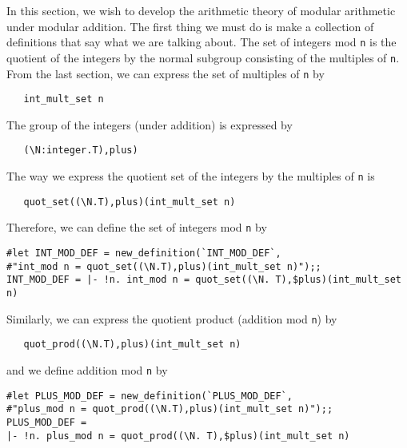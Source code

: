 In this section, we wish to develop the arithmetic theory of modular
arithmetic under modular addition.  The first thing we must do is make
a collection of definitions that say what we are talking about.  The
set of integers mod {\small\tt n} is the quotient of the integers by
the normal subgroup consisting of the multiples of {\small\tt n}.
From the last section, we can express the set of multiples of
{\small\tt n} by 
\begin{verbatim}
   int_mult_set n
\end{verbatim}
The group of the integers (under addition) is expressed by
\begin{verbatim}
   (\N:integer.T),plus)
\end{verbatim}
The way we express the quotient set of the integers by the multiples
of {\small\tt n} is
\begin{verbatim}
   quot_set((\N.T),plus)(int_mult_set n)
\end{verbatim}
Therefore, we can define the set of integers mod {\small\tt n} by
\begin{session}
\begin{verbatim}
#let INT_MOD_DEF = new_definition(`INT_MOD_DEF`,
#"int_mod n = quot_set((\N.T),plus)(int_mult_set n)");;
INT_MOD_DEF = |- !n. int_mod n = quot_set((\N. T),$plus)(int_mult_set n)
\end{verbatim}
\end{session}
Similarly, we can express the quotient product (addition mod
{\small\tt n}) by 
\begin{verbatim}
   quot_prod((\N.T),plus)(int_mult_set n)
\end{verbatim}
and we define addition mod {\small\tt n} by
\begin{session}
\begin{verbatim}
#let PLUS_MOD_DEF = new_definition(`PLUS_MOD_DEF`,
#"plus_mod n = quot_prod((\N.T),plus)(int_mult_set n)");;
PLUS_MOD_DEF = 
|- !n. plus_mod n = quot_prod((\N. T),$plus)(int_mult_set n)
\end{verbatim}
\end{session}

